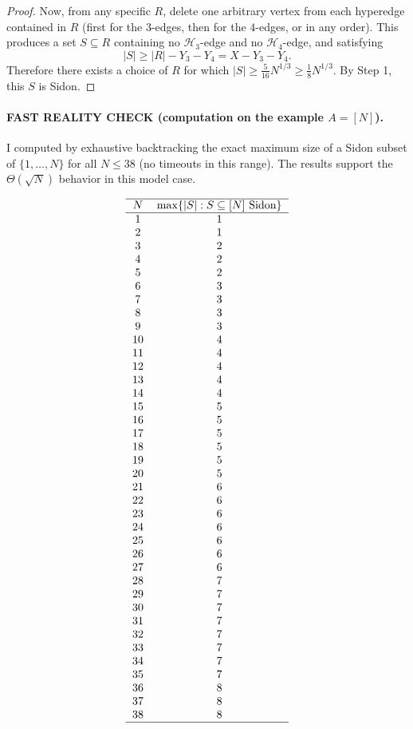 \begin{proof}
Now, from any specific $R$, delete one arbitrary vertex from each hyperedge contained in $R$ (first for the $3$-edges, then for the $4$-edges, or in any order). This produces a set $S\subseteq R$ containing no $\mathcal H_3$-edge and no $\mathcal H_4$-edge, and satisfying
\[
|S|\ge |R|-Y_3-Y_4 = X-Y_3-Y_4.
\]
Therefore there exists a choice of $R$ for which $|S|\ge \frac5{16}N^{1/3}\ge \frac18 N^{1/3}$. By Step 1, this $S$ is Sidon.
\end{proof}

\paragraph{FAST REALITY CHECK (computation on the example $A=[N]$).}
I computed by exhaustive backtracking the exact maximum size of a Sidon subset of $\{1,\dots,N\}$ for all $N\le 38$ (no timeouts in this range). The results support the $\Theta(\sqrt N)$ behavior in this model case.

\[
\begin{tabular}{cc}
 \hline
$N$ & $\max\{|S|:S\subseteq [N]\ \text{Sidon}\}$\\ \hline
1 & 1\\
2 & 1\\
3 & 2\\
4 & 2\\
5 & 2\\
6 & 3\\
7 & 3\\
8 & 3\\
9 & 3\\
10 & 4\\
11 & 4\\
12 & 4\\
13 & 4\\
14 & 4\\
15 & 5\\
16 & 5\\
17 & 5\\
18 & 5\\
19 & 5\\
20 & 5\\
21 & 6\\
22 & 6\\
23 & 6\\
24 & 6\\
25 & 6\\
26 & 6\\
27 & 6\\
28 & 7\\
29 & 7\\
30 & 7\\
31 & 7\\
32 & 7\\
33 & 7\\
34 & 7\\
35 & 7\\
36 & 8\\
37 & 8\\
38 & 8\\
\hline
\end{tabular}
\]

